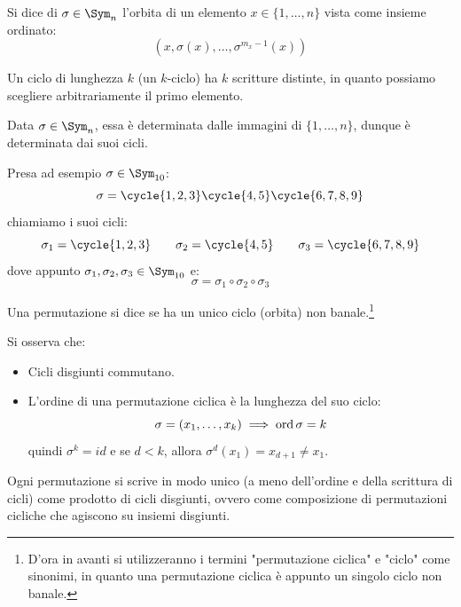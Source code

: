 \documentclass[11pt]{scrartcl}
\begin{document}
\begin{definition}
    Si dice  di $\sigma \in \Sym_n$ l'orbita di un elemento $x \in \{1,\ldots,n\}$ vista come insieme ordinato:
        \[ (x,\sigma(x),\ldots,\sigma^{m_x-1}(x))
            \]
\end{definition}

\begin{remark}
    Un ciclo di lunghezza $k$ (un $k$-ciclo) ha $k$ scritture distinte, in quanto possiamo scegliere arbitrariamente il primo elemento.
\end{remark}

\begin{remark}
    Data $\sigma \in \Sym_n$, essa è determinata dalle immagini di $\{1,\ldots,n\}$, dunque è determinata dai suoi cicli.
\end{remark}

\begin{example}
    Presa ad esempio $\sigma \in \Sym_{10}$:
        \[ \sigma = \cycle{1,2,3}\cycle{4,5}\cycle{6,7,8,9}
            \]
    chiamiamo i suoi cicli:
        \[ \sigma_1 = \cycle{1,2,3} \qquad \sigma_2 = \cycle{4,5} \qquad \sigma_3 = \cycle{6,7,8,9}
            \]
    dove appunto $\sigma_1,\sigma_2,\sigma_3 \in \Sym_{10}$ e:
        \[ \sigma = \sigma_1 \circ \sigma_2 \circ \sigma_3
            \]
\end{example}

\begin{definition}
    Una permutazione si dice  se ha un unico ciclo (orbita) non banale.\footnote{D'ora in avanti si utilizzeranno i termini "permutazione ciclica" e "ciclo" come sinonimi, in quanto una permutazione ciclica è appunto un singolo ciclo non banale.}
\end{definition}

\begin{remark}
    Si osserva che:
        \begin{itemize}
            \item Cicli disgiunti commutano.
            \item L'ordine di una permutazione ciclica è la lunghezza del suo ciclo:
                    \[ \sigma = (x_1,\ldots,x_k) \implies \operatorname{ord} \sigma = k
                        \]
                quindi $\sigma^k = id$ e se $d < k$, allora $\sigma^d(x_1) = x_{d+1} \ne x_1$.
        \end{itemize}
\end{remark}

\begin{proposition}
    \label{perm}
    Ogni permutazione si scrive in modo unico (a meno dell'ordine e della scrittura di cicli) come prodotto di cicli disgiunti,
     ovvero come composizione di permutazioni cicliche che agiscono su insiemi disgiunti.
\end{proposition}
\end{document}
